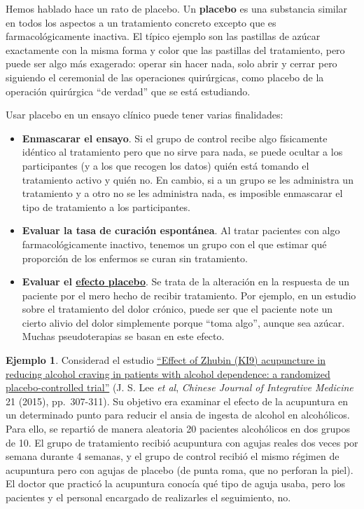 \documentclass[
]{book}
\theoremstyle{definition}
\theoremstyle{definition}
\newtheorem{example}{Ejemplo}[chapter]
\theoremstyle{definition}
\theoremstyle{definition}
\theoremstyle{remark}
\begin{document}
Hemos hablado hace un rato de placebo. Un \textbf{placebo} es una substancia similar en todos los aspectos a un tratamiento concreto excepto que es farmacológicamente inactiva. El típico ejemplo son las pastillas de azúcar exactamente con la misma forma y color que las pastillas del tratamiento, pero puede ser algo más exagerado: operar sin hacer nada, solo abrir y cerrar pero siguiendo el ceremonial de las operaciones quirúrgicas, como placebo de la operación quirúrgica ``de verdad'' que se está estudiando.

Usar placebo en un ensayo clínico puede tener varias finalidades:

\begin{itemize}
\item
  \textbf{Enmascarar el ensayo}. Si el grupo de control recibe algo físicamente idéntico al tratamiento pero que no sirve para nada, se puede ocultar a los participantes (y a los que recogen los datos) quién está tomando el tratamiento activo y quién no. En cambio, si a un grupo se les administra un tratamiento y a otro no se les administra nada, es imposible enmascarar el tipo de tratamiento a los participantes.
\item
  \textbf{Evaluar la tasa de curación espontánea}. Al tratar pacientes con algo farmacológicamente inactivo, tenemos un grupo con el que estimar qué proporción de los enfermos se curan sin tratamiento.
\item
  \textbf{Evaluar el \href{https://es.wikipedia.org/wiki/Efecto_placebo}{efecto placebo}}. Se trata de la alteración en la respuesta de un paciente por el mero hecho de recibir tratamiento. Por ejemplo, en un estudio sobre el tratamiento del dolor crónico, puede ser que el paciente note un cierto alivio del dolor simplemente porque ``toma algo'', aunque sea azúcar. Muchas pseudoterapias se basan en este efecto.
\end{itemize}

\begin{example}
\protect\hypertarget{exm:acupuntura}{}\label{exm:acupuntura}Considerad el estudio \href{https://link.springer.com/article/10.1007/s11655-014-1851-1}{``Effect of Zhubin (KI9) acupuncture in reducing alcohol craving in patients with alcohol dependence: a randomized placebo-controlled trial''} (J. S. Lee \emph{et al}, \emph{Chinese Journal of Integrative Medicine} 21 (2015), pp.~307-311). Su objetivo era examinar el efecto de la acupuntura en un determinado punto para reducir el ansia de ingesta de alcohol en alcohólicos. Para ello, se repartió de manera aleatoria 20 pacientes alcohólicos en dos grupos de 10. El grupo de tratamiento recibió acupuntura con agujas reales dos veces por semana durante 4 semanas, y el grupo de control recibió el mismo régimen de acupuntura pero con agujas de placebo (de punta roma, que no perforan la piel). El doctor que practicó la acupuntura conocía qué tipo de aguja usaba, pero los pacientes y el personal encargado de realizarles el seguimiento, no.
\end{example}
\end{document}
